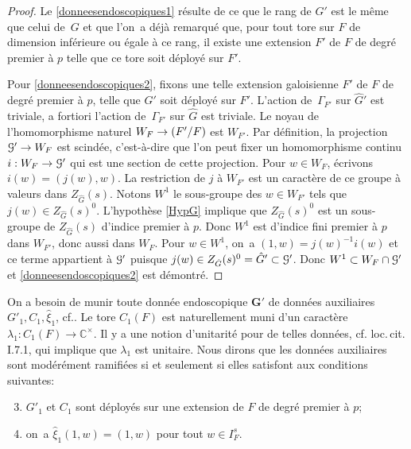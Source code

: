\documentclass[11pt]{article}
\newcommand{\cf}{cf.\xspace}
\numberwithin{equation}{section}\providecommand{\og}{«\,}\providecommand{\fg}{\,»}
\let\mathcal \EuScript
\newcommand{\NoChangel}[1]{%
\expandafter\let\csname old\string#1\endcsname=#1
\let#1=\relax
\newcommand{#1}{\mathcode`l="716C\csname old\string#1\endcsname\mathcode`l="7160 }%
}
\DeclareMathOperator{\Gal}{Gal}\NoChangel{\Gal}
\newcommand{\bG}{\boldsymbol{G}}
\newcommand{\cG}{\mathcal{G}}
\newcommand{\CC}{\mathbb{C}}
\theoremstyle{plain}
\theoremstyle{definition}
\begin{document}
\begin{proof}
Le \eqref{donneesendoscopiques1} résulte de ce que le rang de $G'$ est le même que celui de~$G$ et que l'on~a déjà remarqué que, pour tout tore sur $F$ de dimension inférieure ou égale à ce rang, il existe une extension $F'$ de $F$ de degré premier à $p$ telle que ce tore soit déployé sur $F'$.

Pour \eqref{donneesendoscopiques2}, fixons une telle extension galoisienne $F'$ de $F$ de degré premier à $p$, telle que $G'$ soit déployé sur $F'$. L'action de~$\Gamma_{F'}$ sur $\hat{G}'$ est triviale, a fortiori l'action de~$\Gamma_{F'}$ sur $\hat{G}$ est triviale. Le noyau de l'homomorphisme naturel $W_{F}\to \Gal(F'/F)$ est $W_{F'}$.
Par définition, la projection $\cG'\to W_{F}$ est scindée, c'est-à-dire que l'on peut fixer un homomorphisme continu $i:W_{F}\to \cG'$ qui est une section de cette projection. Pour $w\in W_{F}$, écrivons $i(w)=(j(w),w)$. La restriction de $j$ à $W_{F'}$ est un caractère de ce groupe à valeurs dans $Z_{\hat{G}}(s)$. Notons $W^1$ le sous-groupe des $w\in W_{F'}$ tels que $j(w)\in Z_{\hat{G}}(s)^0$. L'hypothèse \ref{HypG} implique que $Z_{\hat{G}}(s)^0$ est un sous-groupe de $Z_{\hat{G}}(s)$ d'indice premier à $p$. Donc $W^1$ est d'indice fini premier à $p$ dans $W_{F'}$, donc aussi dans $W_{F}$. Pour $w\in W^1$, on~a $(1,w)=j(w)^{-1}i(w)$ et ce terme appartient à $ \cG'$ puisque $j(w)\in Z_{\hat{G}}(s)^0=\hat{G}'\subset \cG'$. Donc $W^1\subset W_{F}\cap \cG'$ et \eqref{donneesendoscopiques2} est démontré.
\end{proof}

On a besoin de munir toute donnée endoscopique $\bG'$ de données auxiliaires $G'_{1},C_{1},\hat{\xi}_{1}$, \cf \cite[I.2.1]{MW}. Le tore $C_{1}(F)$ est naturellement muni d'un caractère $\lambda_{1}:C_{1}(F)\to \CC^{\times}$. Il y a une notion d'unitarité pour de telles données, \cf loc.\,cit.\,I.7.1, qui implique que $\lambda_{1}$ est unitaire.
Nous dirons que les données auxiliaires sont modérément ramifiées si et seulement si elles satisfont aux conditions suivantes:
\begin{enumerate}\setcounter{enumi}{2}
\item\label{donneesendoscopiques3}
$G'_{1}$ et $C_{1}$ sont déployés sur une extension de $F$ de degré premier à $p$;

\item\label{donneesendoscopiques4}
on~a $\hat{\xi}_{1}(1,w)=(1,w)$ pour tout $w\in I_{F}^s$.
\end{enumerate}
\end{document}
